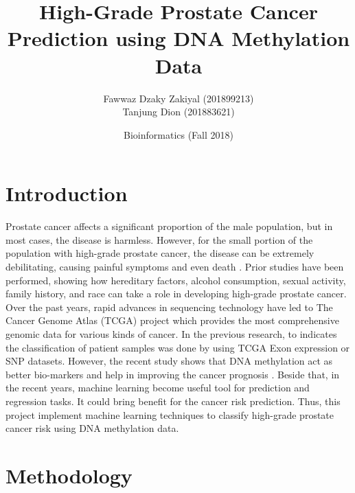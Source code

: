 \documentclass[a4paper,oneside]{article}
\begin{document}
\title{\vspace{-0.7in}High-Grade Prostate Cancer Prediction using DNA Methylation Data}
\author{Fawwaz Dzaky Zakiyal (201899213)\\Tanjung Dion (201883621)\\}
\date{Bioinformatics (Fall 2018)}
\maketitle
 
\section{Introduction}
Prostate cancer affects a significant proportion of the male population, but in most cases, the disease is harmless. However, for the small portion of the population with high-grade prostate cancer, the disease can be extremely debilitating, causing painful symptoms and even death \cite{prostate}. Prior studies have been performed, showing how hereditary factors, alcohol consumption, sexual activity, family history, and race can take a role in developing high-grade prostate cancer. Over the past years, rapid advances in sequencing technology have led to The Cancer Genome Atlas (TCGA) project which provides the most comprehensive genomic data for various kinds of cancer. In the previous research, to indicates the classification of patient samples was done by using TCGA Exon expression or SNP datasets. However, the recent study shows that DNA methylation act as better bio-markers and help in improving the cancer prognosis \cite{dnameth}. Beside that, in the recent years, machine learning become useful tool for prediction and regression tasks. It could bring benefit for the cancer risk prediction. Thus, this project implement machine learning techniques to classify high-grade prostate cancer risk using DNA methylation data.


\section{Methodology}
\end{document}
